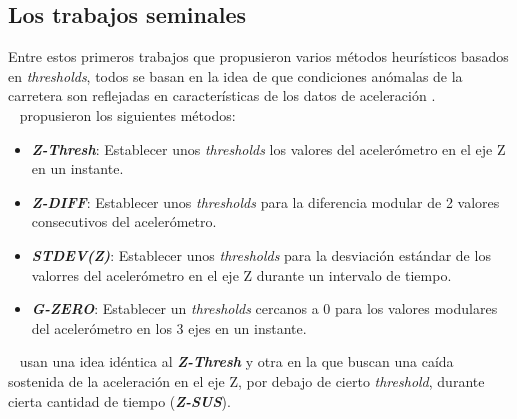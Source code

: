 	\subsection{Los trabajos seminales}
		Entre estos primeros trabajos que propusieron varios métodos heurísticos basados en \emph{thresholds}, todos se basan en la idea
		de que condiciones anómalas de la carretera son reflejadas en características de los datos de aceleración .\\
		~\textcite{mednis2011real} propusieron los siguientes métodos:\\

		\begin{itemize}
			\item  \emph{\textbf {Z-Thresh}}: Establecer unos \emph{thresholds} los valores del acelerómetro en el eje Z en un instante.\\
			\item \emph{\textbf {Z-DIFF}}: Establecer unos \emph{thresholds} para la diferencia modular de 2 valores consecutivos del
				acelerómetro.\\
			\item \emph{\textbf {STDEV(Z)}}: Establecer unos \emph{thresholds} para la desviación estándar de los valorres del acelerómetro en
				el eje Z durante un intervalo de tiempo.\\ 
			\item \emph{\textbf {G-ZERO}}: Establecer un \emph{thresholds} cercanos a 0 para los valores modulares del acelerómetro
				en los 3 ejes en un instante.\\
		\end{itemize}

		~\textcite{mohan2008nericell} usan una idea idéntica al \emph{\textbf{Z-Thresh}} y otra en la que buscan una caída sostenida de la 
		aceleración en el eje Z, por debajo de cierto \emph{threshold}, durante cierta cantidad de tiempo (\emph{\textbf{Z-SUS}}).\\


